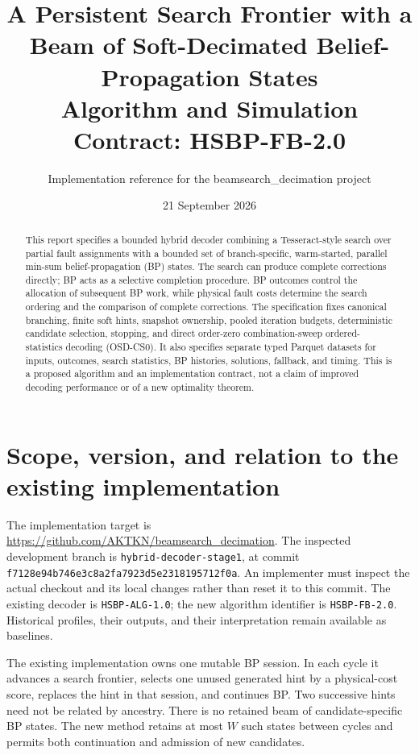 \documentclass[11pt,a4paper]{article}
\title{A Persistent Search Frontier with a Beam of Soft-Decimated Belief-Propagation States\\\large Algorithm and Simulation Contract: HSBP-FB-2.0}
\author{Implementation reference for the beamsearch\_decimation project}
\date{21 September 2026}
\newcommand{\code}[1]{\nolinkurl{#1}}
\begin{document}
\maketitle
\begin{abstract}
This report specifies a bounded hybrid decoder combining a Tesseract-style search over partial fault assignments with a bounded set of branch-specific, warm-started, parallel min-sum belief-propagation (BP) states. The search can produce complete corrections directly; BP acts as a selective completion procedure. BP outcomes control the allocation of subsequent BP work, while physical fault costs determine the search ordering and the comparison of complete corrections. The specification fixes canonical branching, finite soft hints, snapshot ownership, pooled iteration budgets, deterministic candidate selection, stopping, and direct order-zero combination-sweep ordered-statistics decoding (OSD-CS0). It also specifies separate typed Parquet datasets for inputs, outcomes, search statistics, BP histories, solutions, fallback, and timing. This is a proposed algorithm and an implementation contract, not a claim of improved decoding performance or of a new optimality theorem.
\end{abstract}
\newpage
\tableofcontents
\newpage

\section{Scope, version, and relation to the existing implementation}
The implementation target is \url{https://github.com/AKTKN/beamsearch_decimation}. The inspected development branch is \code{hybrid-decoder-stage1}, at commit \code{f7128e94b746e3c8a2fa7923d5e2318195712f0a}. An implementer must inspect the actual checkout and its local changes rather than reset it to this commit. The existing decoder is \code{HSBP-ALG-1.0}; the new algorithm identifier is \code{HSBP-FB-2.0}. Historical profiles, their outputs, and their interpretation remain available as baselines.

The existing implementation owns one mutable BP session. In each cycle it advances a search frontier, selects one unused generated hint by a physical-cost score, replaces the hint in that session, and continues BP. Two successive hints need not be related by ancestry. There is no retained beam of candidate-specific BP states. The new method retains at most $W$ such states between cycles and permits both continuation and admission of new candidates.
\end{document}
